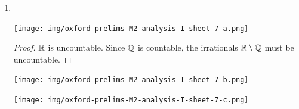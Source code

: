 \begin{enumerate}
  \begin{proof}
    Let $S = \{x \in \R ~|~ x^3 < 2\}$. Since $S$ is bounded above, $\sup S$ exists. Let
    $a = \sup S$. By trichotomy it suffices to show that $a^3 < 2$ and $a^3 > 2$ lead to
    contradictions.

    First suppose $a^3 < 2$. We seek $h > 0$ such that $(a + h)^3 < 2$ since then $a + h \in S$,
    which would contradict the definition $a := \sup S$. Note that
    \begin{align*}
      (a + h)^3 &= a^3 + 3a^2h + 3ah^2 + h^3 - 2\\
                &< a^3 + 7a^2h - 2 ~~~~~~~~~~~~~~~~~~~~~~~~\text{if $h < a$}\\
                &< 0              ~~~~~~~~~~~~~~~~~~~~~~~~~~~~~~~~~~~~~~~~~\text{if $h < \frac{2 - a^3}{7a^2}$},
    \end{align*}
    therefore if we take $h < \min\(a, \frac{2 - a^3}{7a^2}\)$ then we have the desired
    contradiction.

    Alternatively suppose that $a^3 > 2$. By the Approximation Property for all $0 < h < a$ we can
    find $s \in S$ such that $a - h < s$, therefore $(a - h)^3 < s^3$. We seek an $h$ for which
    $(a - h)^3 > 2$ since then we would have $s^3 > 2$ which would contradict the definition of
    $S$. Note that
    \begin{align*}
      (a - h)^3 - 2 &= a^3 - 3a^2h + 3ah^2 - h^3 - 2\\
                    &> 0 ~~~~~~~~~~~~~~~~~~~~~~~~~~~~~~~~~~~~~~~~~\text{if $3ah^2 > 3a^2h + h^3$}.
    \end{align*}
    So we require $3ah > 3a^2 + h^2 \iff 3a^2 - 3ah + h^2 < 0$.

  \end{proof}

  \newpage
\item~\\
  \begin{mdframed}
    \texttt{[image: img/oxford-prelims-M2-analysis-I-sheet-7-a.png]}
  \end{mdframed}
  \begin{proof}
    $\mathbb{R}$ is uncountable. Since $\mathbb{Q}$ is countable, the irrationals $\mathbb{R} \setminus \mathbb{Q}$ must be
    uncountable.
  \end{proof}
  \begin{mdframed}
    \texttt{[image: img/oxford-prelims-M2-analysis-I-sheet-7-b.png]}
  \end{mdframed}
  \begin{mdframed}
    \texttt{[image: img/oxford-prelims-M2-analysis-I-sheet-7-c.png]}
  \end{mdframed}

\end{enumerate}


